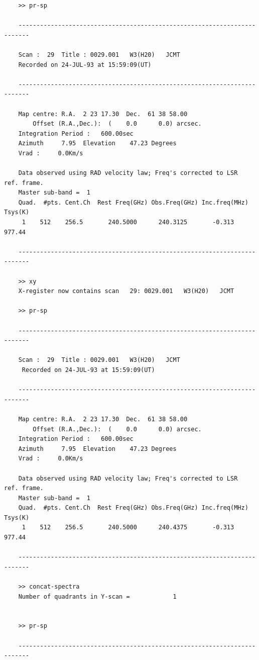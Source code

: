 \documentclass[11pt,twoside]{report}
\begin{document}
\begin{verbatim}
    >> pr-sp

    -------------------------------------------------------------------------

    Scan :  29  Title : 0029.001   W3(H20)   JCMT
    Recorded on 24-JUL-93 at 15:59:09(UT)

    -------------------------------------------------------------------------

    Map centre: R.A.  2 23 17.30  Dec.  61 38 58.00
        Offset (R.A.,Dec.):  (    0.0      0.0) arcsec.
    Integration Period :   600.00sec
    Azimuth     7.95  Elevation    47.23 Degrees
    Vrad :     0.0Km/s

    Data observed using RAD velocity law; Freq's corrected to LSR  ref. frame.
    Master sub-band =  1
    Quad.  #pts. Cent.Ch  Rest Freq(GHz) Obs.Freq(GHz) Inc.freq(MHz) Tsys(K)
     1    512    256.5       240.5000      240.3125       -0.313    977.44

    -------------------------------------------------------------------------

    >> xy
    X-register now contains scan   29: 0029.001   W3(H20)   JCMT

    >> pr-sp

    -------------------------------------------------------------------------

    Scan :  29  Title : 0029.001   W3(H20)   JCMT
     Recorded on 24-JUL-93 at 15:59:09(UT)

    -------------------------------------------------------------------------

    Map centre: R.A.  2 23 17.30  Dec.  61 38 58.00
        Offset (R.A.,Dec.):  (    0.0      0.0) arcsec.
    Integration Period :   600.00sec
    Azimuth     7.95  Elevation    47.23 Degrees
    Vrad :     0.0Km/s

    Data observed using RAD velocity law; Freq's corrected to LSR  ref. frame.
    Master sub-band =  1
    Quad.  #pts. Cent.Ch  Rest Freq(GHz) Obs.Freq(GHz) Inc.freq(MHz) Tsys(K)
     1    512    256.5       240.5000      240.4375       -0.313    977.44

    -------------------------------------------------------------------------

    >> concat-spectra
    Number of quadrants in Y-scan =            1


    >> pr-sp

    -------------------------------------------------------------------------


\end{verbatim}
\end{document}
